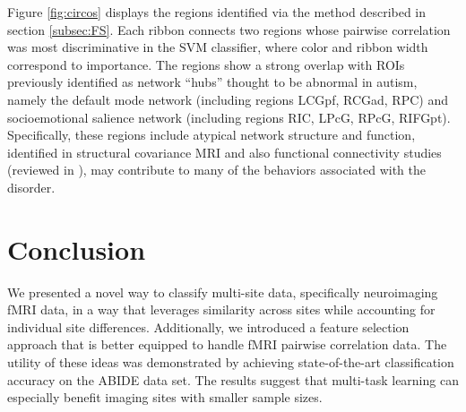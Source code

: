 \documentclass{llncs}
\begin{document}
Figure \ref{fig:circos} displays the regions identified via the method described
in section \ref{subsec:FS}.  Each ribbon connects two regions whose pairwise correlation was most discriminative in the SVM classifier, where color and ribbon width correspond to importance. The regions show a strong overlap with ROIs previously
identified as network ``hubs'' thought to be abnormal in autism, namely the
default mode network (including regions LCGpf, RCGad, RPC) and socioemotional salience
network (including regions RIC, LPcG, RPcG, RIFGpt).  Specifically, these regions include
atypical network structure and function, identified in structural covariance MRI
\cite{zielinski2012scmri} and also functional connectivity studies (reviewed in
\cite{jeff2014}), may contribute to many of the behaviors associated with the
disorder.

\section{Conclusion}
We presented a novel way to classify multi-site data, specifically neuroimaging
fMRI data, in a way that leverages similarity across sites while accounting for
individual site differences.  Additionally, we introduced a feature selection
approach that is better equipped to handle fMRI pairwise correlation data.  The
utility of these ideas was demonstrated by achieving state-of-the-art
classification accuracy on the ABIDE data set. The results suggest that
multi-task learning can especially benefit imaging sites with smaller sample
sizes.


{}

\end{document}
